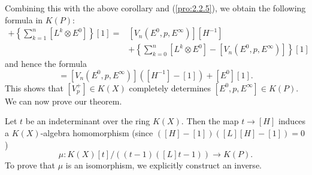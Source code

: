 Combining this with the above corollary and (\ref{pro:2.2.5}), we obtain the following formula in $K(P)$:
\begin{align*}
    [E^0, p, E^\infty] + \left\{\sum_{k=1}^n [L^k \otimes E^0] \right\}[1] =& [V_n(E^0, p, E^\infty)][H^{-1}] \\
    &+ \left\{\sum_{k=0}^n [L^k \otimes E^0] - [V_n(E^0, p, E^\infty)] \right\}[1]
\end{align*}
and hence the formula
\begin{equation*}
    [E^0, p, E^\infty] = [V_n(E^0, p, E^\infty)]([H^{-1}] - [1]) + [E^0][1] .
\end{equation*}
This shows that $[V^+_p] \in K(X)$ completely determines $[E^0, p, E^\infty] \in K(P)$. We can now prove our theorem. \par

Let $t$ be an indeterminant over the ring $K(X)$. Then the map $t \to [H]$ induces a $K(X)$-algebra homomorphism (since $([H] - [1])([L][H] - [1]) = 0$)
\begin{equation*}
    \mu: K(X)[t] / ((t-1)([L]t-1)) \to K(P) .
\end{equation*}
To prove that $\mu$ is an isomorphism, we explicitly construct an inverse. \par 

